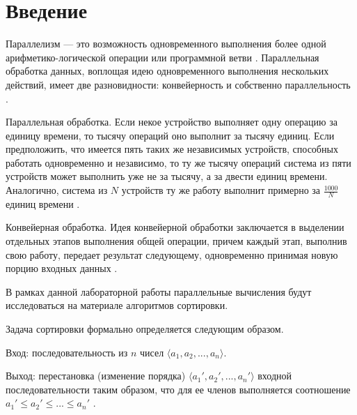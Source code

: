 {\center\chapter*{Введение}}

Параллелизм --- это возможность одновременного выполнения более одной арифметико-логической операции или программной ветви \cite{Shpakovskiy2013}. 
Параллельная обработка данных, воплощая идею одновременного выполнения нескольких действий, имеет две разновидности: конвейерность и собственно параллельность \cite{Antonov2002}.

Параллельная обработка. 
Если некое устройство выполняет одну операцию за единицу времени, то тысячу операций оно выполнит за тысячу единиц. 
Если предположить, что имеется пять таких же независимых устройств, способных работать одновременно и независимо, то ту же тысячу операций система из пяти устройств может выполнить уже не за тысячу, а за двести единиц времени. 
Аналогично, система из $N$ устройств ту же работу выполнит примерно за $\frac{1000}{N}$ единиц времени \cite{Antonov2002}.

Конвейерная обработка. 
Идея конвейерной обработки заключается в выделении отдельных этапов выполнения общей операции, причем каждый этап, выполнив свою работу, передает результат следующему, одновременно принимая новую порцию входных данных \cite{Antonov2002}.

В рамках данной лабораторной работы параллельные вычисления будут исследоваться на материале алгоритмов сортировки.

Задача сортировки формально определяется следующим образом.

Вход: последовательность из $n$ чисел $\langle a_1, a_2,...,a_n \rangle$.

Выход: перестановка (изменение порядка) $\langle a_1', a_2',...,a_n' \rangle$ входной последовательности таким образом, что для ее членов выполняется соотношение $a_1' \leq a_2'\leq ... \leq a_n'$ \cite{Cormen2011}.
